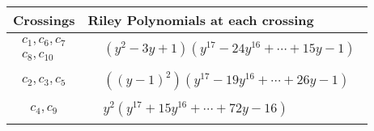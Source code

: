 \documentclass[1p]{elsarticle_modified}
\theoremstyle{definition}
\begin{document}
\begin{tabular}{m{50pt}|m{274pt}}
Crossings & \hspace{64pt}Riley Polynomials at each crossing \\
\hline $$\begin{aligned}c_{1},c_{6},c_{7}\\c_{8},c_{10}\end{aligned}$$&$\begin{aligned}
&(y^2-3 y+1)(y^{17}-24 y^{16}+\cdots+15 y-1)
\end{aligned}$\\
\hline $$\begin{aligned}c_{2},c_{3},c_{5}\end{aligned}$$&$\begin{aligned}
&((y-1)^2)(y^{17}-19 y^{16}+\cdots+26 y-1)
\end{aligned}$\\
\hline $$\begin{aligned}c_{4},c_{9}\end{aligned}$$&$\begin{aligned}
&y^2(y^{17}+15 y^{16}+\cdots+72 y-16)
\end{aligned}$\\
\hline
\end{tabular}
\vskip 2pc
\end{document}
